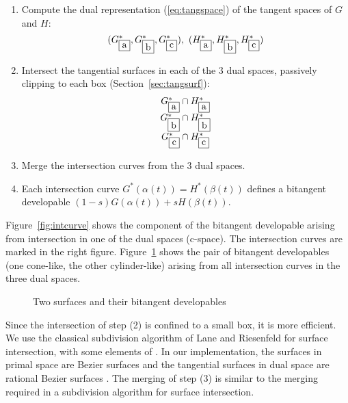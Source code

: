 \documentclass[12pt]{article}
\begin{document}
\begin{enumerate}
\item Compute the dual representation (\ref{eq:tangspace}) of the tangent
	spaces of $G$ and $H$:
\[
	(G^*_{\fbox{a}}, G^*_{\fbox{b}}, G^*_{\fbox{c}}),\ 
	(H^*_{\fbox{a}}, H^*_{\fbox{b}}, H^*_{\fbox{c}})
\]
\item Intersect the tangential surfaces in each of the 3 dual spaces, 
	passively clipping to each box (Section~\ref{sec:tangsurf}):
\[
\begin{tabular}{c}
	$G^*_{\fbox{a}} \cap H^*_{\fbox{a}}$ \\
	$G^*_{\fbox{b}} \cap H^*_{\fbox{b}}$ \\
	$G^*_{\fbox{c}} \cap H^*_{\fbox{c}}$
\end{tabular}
\]
\item Merge the intersection curves from the 3 dual spaces.
\item Each intersection curve $G^*(\alpha(t)) = H^*(\beta(t))$ 
      defines a bitangent developable $(1-s) G(\alpha(t)) + s H(\beta(t))$.
\end{enumerate}

Figure~\ref{fig:intcurve} shows the component of the bitangent developable 
arising from intersection in one of the dual spaces (c-space).
The intersection curves are marked in the right figure.
Figure~\ref{fig:bitangdev} shows the pair of bitangent developables (one cone-like, the
other cylinder-like) arising from
all intersection curves in the three dual spaces.

\begin{figure}[b]
\caption{Two surfaces and their bitangent developables}
\label{fig:bitangdev}
\end{figure}

Since the intersection of step (2) is confined to a small box, it is more 
efficient.
We use the classical subdivision algorithm of Lane and Riesenfeld \cite{lane80}
for surface intersection, 
with some elements of \cite{nat90}.
In our implementation, the surfaces in primal space
are Bezier surfaces and the tangential surfaces in dual space
are rational Bezier surfaces \cite{jj01b}.
The merging of step (3) is similar to the merging required in a subdivision
algorithm for surface intersection.

\clearpage

\end{document}
